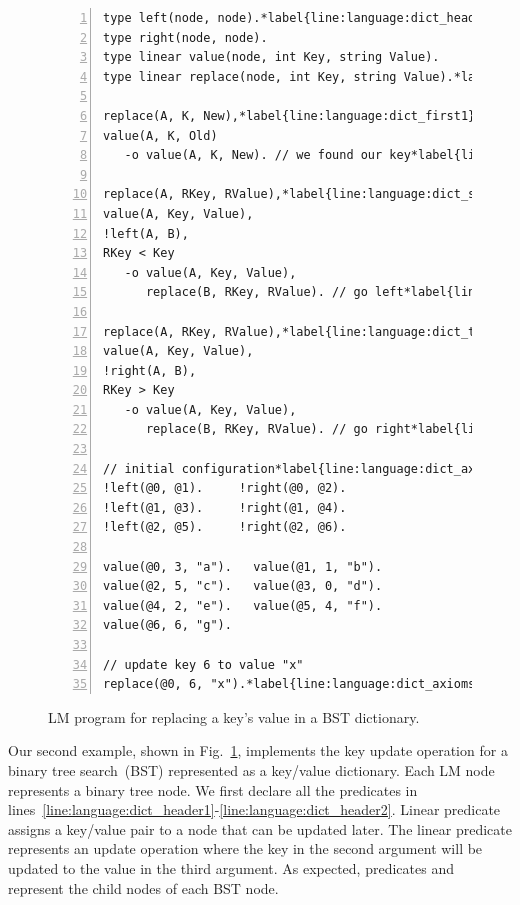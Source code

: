 
\begin{figure}[ht]
\begin{Verbatim}[numbers=left,fontsize=\codesize,commandchars=\*\{\}]
type left(node, node).*label{line:language:dict_header1}
type right(node, node).
type linear value(node, int Key, string Value).
type linear replace(node, int Key, string Value).*label{line:language:dict_header2}

replace(A, K, New),*label{line:language:dict_first1}
value(A, K, Old)
   -o value(A, K, New). // we found our key*label{line:language:dict_first2}

replace(A, RKey, RValue),*label{line:language:dict_second1}
value(A, Key, Value),
!left(A, B),
RKey < Key
   -o value(A, Key, Value),
      replace(B, RKey, RValue). // go left*label{line:language:dict_second2}

replace(A, RKey, RValue),*label{line:language:dict_third1}
value(A, Key, Value),
!right(A, B),
RKey > Key
   -o value(A, Key, Value),
      replace(B, RKey, RValue). // go right*label{line:language:dict_third2}

// initial configuration*label{line:language:dict_axioms1}
!left(@0, @1).     !right(@0, @2).
!left(@1, @3).     !right(@1, @4). 
!left(@2, @5).     !right(@2, @6).

value(@0, 3, "a").   value(@1, 1, "b").
value(@2, 5, "c").   value(@3, 0, "d").
value(@4, 2, "e").   value(@5, 4, "f").
value(@6, 6, "g").

// update key 6 to value "x"
replace(@0, 6, "x").*label{line:language:dict_axioms2}
\end{Verbatim}
\caption{LM program for replacing a key's value in a BST dictionary.}
\label{code:language:btree_replace}
\end{figure}

Our second example, shown in Fig.~\ref{code:language:btree_replace}, implements
the key update operation for a binary tree search~(BST) represented as a
key/value dictionary. Each LM node represents a binary tree node. We first
declare all the predicates in
lines~\ref{line:language:dict_header1}-\ref{line:language:dict_header2}.  Linear
predicate  assigns a key/value pair to a node that can be updated
later. The  linear predicate represents an update operation where
the key in the second argument will be updated to the value in the third
argument. As expected, predicates  and  represent the
child nodes of each BST node.

